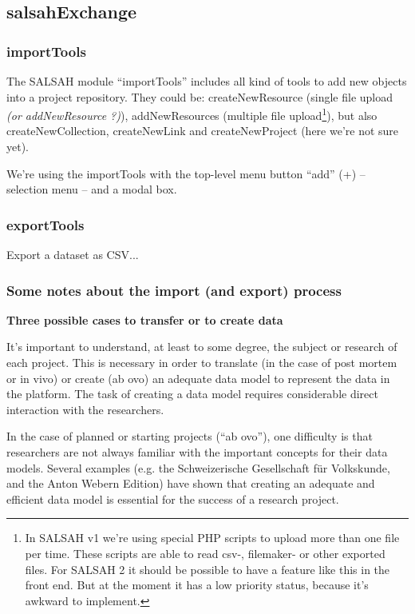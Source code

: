 \newpage
\subsection{salsahExchange}
\subsubsection{importTools}
The SALSAH module ``importTools'' includes all kind of tools to add new objects into a project repository. They could be: createNewResource (single file upload \textit{(or addNewResource ?)}), addNewResources (multiple file upload\footnote{In SALSAH v1 we're using special PHP scripts to upload more than one file per time. These scripts are able to read csv-, filemaker- or other exported files. For SALSAH 2 it should be possible to have a feature like this in the front end. But at the moment it has a low priority status, because it's awkward to implement.}), but also createNewCollection, createNewLink and createNewProject (here we're not sure yet).

We're using the importTools with the top-level menu button ``add'' (+) -- selection menu -- and a modal box.


\subsubsection{exportTools}
Export a dataset as CSV...

\subsubsection{Some notes about the import (and export) process} %

\textbf{Three possible cases to transfer or to create data} %

It's important to understand, at least to some degree, the subject or research of each project. This is necessary in order to translate (in the case of post mortem or in vivo) or create (ab ovo) an adequate data model to represent the data in the platform. The task of creating a data model requires considerable direct interaction with the researchers.

In the case of planned or starting projects (``ab ovo''), one difficulty is that researchers are not always familiar with the important concepts for their data models. Several examples (e.g. the Schweizerische Gesellschaft für Volkskunde, and the Anton Webern Edition) have shown that creating an adequate and efficient data model is essential for the success of a research project.

